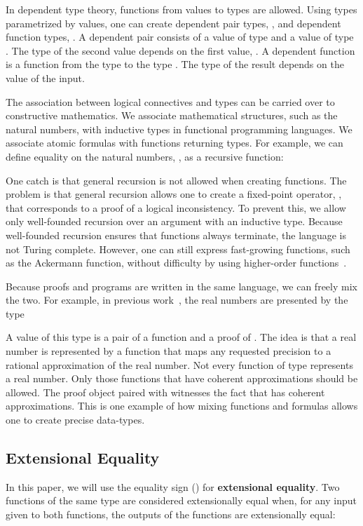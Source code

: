 \documentclass{elsarticle}
\newcommand{\tmdfn}[1]{\textbf{#1}}
\begin{document}
In dependent type theory, functions from values to types are allowed. Using
types parametrized by values, one can create dependent pair types, , and dependent function types, . A dependent pair
consists of a value  of type  and a value of type . The type of the
second value depends on the first value, . A dependent function is a
function from the type  to the type . The type of the result depends
on the value of the input.

The association between logical connectives and types can be carried over to
constructive mathematics. We associate mathematical structures, such as the
natural numbers, with inductive types in functional programming languages. We
associate atomic formulas with functions returning types. For example, we can
define equality on the natural numbers, , as a recursive
function:

One catch is that general recursion is not allowed when creating functions.
The problem is that general recursion allows one to create a fixed-point
operator, , that corresponds to a proof of a logical inconsistency. To prevent
this, we allow only well-founded recursion over an argument with an inductive
type. Because well-founded recursion ensures that functions always terminate,
the language is not Turing complete. However, one can still express
fast-growing functions, such as the Ackermann function, without difficulty by
using higher-order functions~{\cite{Thompson:1991}}.

Because proofs and programs are written in the same language, we can freely
mix the two. For example, in previous work~{\cite{OConnor:mscs}}, the real
numbers are presented by the type

A value of this type is a pair of a function  and a proof of . The
idea is that a real number is represented by a function  that maps any
requested precision  to a rational approximation
of the real number. Not every function of type  represents a real number. Only those functions that have coherent
approximations should be allowed. The proof object paired with  witnesses
the fact that  has coherent approximations. This is one example of how
mixing functions and formulas allows one to create precise data-types.

\subsection{Extensional Equality}In this paper, we will use the
equality sign () for {\tmdfn{extensional equality}}.
Two functions  of the same type are considered extensionally equal when,
for any input given to both functions, the outputs of the functions are
extensionally equal:
\end{document}
